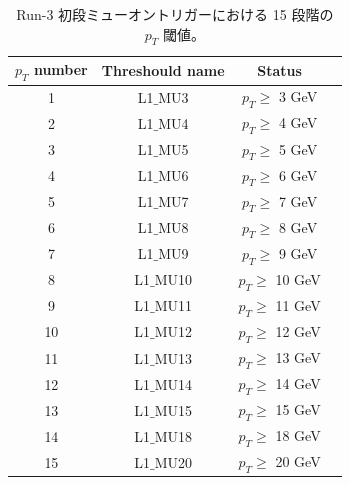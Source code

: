 \begin{table}[]
    \caption{Run-3 初段ミューオントリガーにおける 15 段階の $p_T$ 閾値。}
    \label{pt_number}
    \centering
    \begin{tabular}{|c|c|c|c|}
        \hline
        $p_T$ number & Threshould name & Status\\
        \hline
        1 & L1$\_$MU3 & $p_T \geq$ 3 GeV \\
        \hline
        2 & L1$\_$MU4 & $p_T \geq$ 4 GeV \\
        \hline
        3 & L1$\_$MU5 & $p_T \geq$ 5 GeV \\
        \hline
        4 & L1$\_$MU6 & $p_T \geq$ 6 GeV \\
        \hline
        5 & L1$\_$MU7 & $p_T \geq$ 7 GeV \\
        \hline
        6 & L1$\_$MU8 & $p_T \geq$ 8 GeV \\
        \hline
        7 & L1$\_$MU9 & $p_T \geq$ 9 GeV \\
        \hline
        8 & L1$\_$MU10 & $p_T \geq$ 10 GeV \\
        \hline
        9 & L1$\_$MU11 & $p_T \geq$ 11 GeV \\
        \hline
        10 & L1$\_$MU12 & $p_T \geq$ 12 GeV \\
        \hline
        11 & L1$\_$MU13 & $p_T \geq$ 13 GeV \\
        \hline
        12 & L1$\_$MU14 & $p_T \geq$ 14 GeV \\
        \hline
        13 & L1$\_$MU15 & $p_T \geq$ 15 GeV \\
        \hline
        14 & L1$\_$MU18 & $p_T \geq$ 18 GeV \\
        \hline
        15 & L1$\_$MU20 & $p_T \geq$ 20 GeV \\
        \hline
    \end{tabular}
\end{table}

